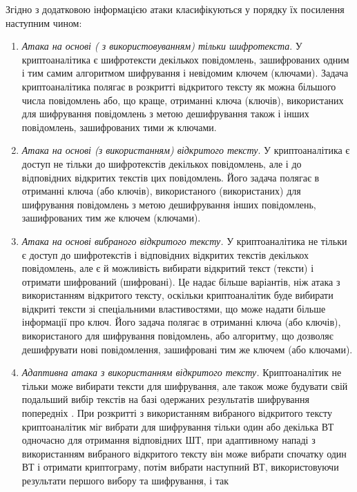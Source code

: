 Згідно з додатковою інформацією атаки класифікуються у порядку їх посилення
наступним чином:
\begin{enumerate}
    \item\label{item:attack:CT} \textit{Атака на основі ( з використовуванням) тільки шифротекста}. У криптоаналітика є шифротексти декількох повідомлень,
        зашифрованих одним і тим самим алгоритмом шифрування і невідомим ключем
        (ключами). Задача криптоаналітика полягає в розкритті відкритого тексту
        як можна більшого числа повідомлень або, що краще, отриманні ключа
        (ключів), використаних для шифрування повідомлень з метою дешифрування
        також і інших повідомлень, зашифрованих тими ж ключами.
\item\label{item:attack:OT} \textit{Атака на основі (з використанням)
    відкритого тексту}. У криптоаналітика є доступ не тільки до шифротекстів
    декількох повідомлень, але і до відповідних відкритих текстів цих
    повідомлень. Його задача полягає в отриманні ключа (або ключів),
    використаного (використаних) для шифрування повідомлень з метою
    дешифрування інших повідомлень, зашифрованих тим же ключем (ключами).
\item\label{item:attack:chosenOT} \textit{Атака на основі вибраного відкритого
    тексту.} У криптоаналітика не тільки є доступ до шифротекстів і відповідних
    відкритих текстів декількох повідомлень, але є й можливість вибирати
    відкритий текст (тексти) і отримати шифрований (шифровані). Це надає більше
    варіантів, ніж атака з використанням відкритого тексту, оскільки
    криптоаналітик буде вибирати  відкриті тексти зі спеціальними
    властивостями, що може надати більше інформації про ключ. Його задача
    полягає в отриманні ключа (або ключів), використаного для шифрування
    повідомлень, або алгоритму, що дозволяє дешифрувати нові повідомлення,
    зашифровані тим  же ключем (або ключами).
\item\label{item:attack:adaptiveOT} \textit{Адаптивна атака з використанням
    відкритого тексту.} Криптоаналітик не тільки може вибирати тексти для
    шифрування, але також може будувати свій подальший вибір текстів на базі
    одержаних результатів шифрування попередніх .  При розкритті з
    використанням вибраного відкритого тексту криптоаналітик міг вибрати для
    шифрування тільки один або декілька ВТ одночасно для отримання відповідних
    ШТ, при адаптивному нападі з використанням вибраного відкритого тексту він
    може вибрати спочатку один ВТ і отримати криптограму, потім вибрати
    наступний ВТ, використовуючи результати першого вибору та шифрування, і так

\end{enumerate}
